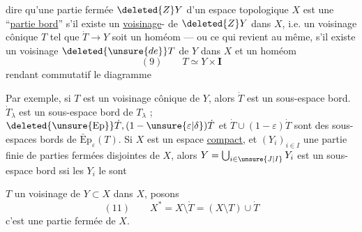    dire qu'une partie fermée $\deleted{Z}Y$ d'un
espace topologique $X$ est une ``\uline{partie bord}''
s'il existe un \uline{voisinage}-
 de $\deleted{Z}Y$ dans $X$,
i.e. un voisinage  cônique $T$ tel que
$\dot T\longrightarrow Y$ soit un homéom --- ou ce qui revient
au même,  s'il existe un
voisinage $\deleted{\unsure{de}}T$ de $Y$ dans $X$ et un homéom
\[
(9)\qquad T\simeq Y\times\mathbf{I}
\]
rendant commutatif le diagramme

Par exemple, si $T$ est un voisinage  cônique
 de  $Y$, alors $\dot T$ est un sous-espace bord.
 $\dot T_\lambda$ est un sous-espace bord de $T_\lambda$ ;
$\deleted{\unsure{\mathrm{Ep}}}\dot T,(1-\unsure{\varepsilon|\delta})\dot T$
et $\dot T\cup(1-\varepsilon)\dot T$ sont des sous-espaces
bords de $\bar{\mathrm{E}}\mathrm{p}_\varepsilon(T)$. 
Si $X$ est un espace
\uline{compact}, et $(Y_i)_{i\in I}$ une partie finie de
parties fermées disjointes de $X$, alors
$Y=\bigcup_{i\in\unsure{J|I}}Y_i$ est un sous-espace bord ssi les $Y_i$ le sont

 $T$ un voisinage
 de $Y\subset X$
dans $X$, posons
\[
(11)\qquad X^*=X\setminus\mathring T=(X\setminus T)\cup\dot T
\]
c'est une partie fermée de $X$. 

